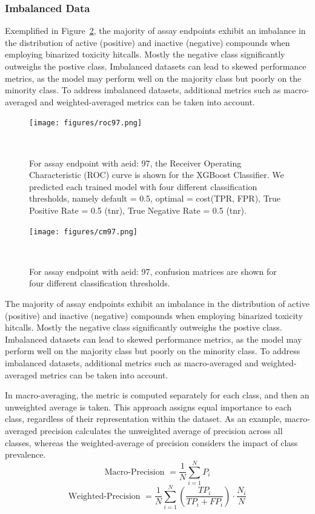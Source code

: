 \subsubsection{Imbalanced Data}
Exemplified in Figure~\ref{fig:confusion_matrix}, the majority of assay endpoints exhibit an imbalance in the distribution of active (positive) and inactive (negative) compounds when employing binarized toxicity hitcalls. Mostly the negative class significantly outweighs the postive class. Imbalanced datasets can lead to skewed performance metrics, as the model may perform well on the majority class but poorly on the minority class. To address imbalanced datasets, additional metrics such as macro-averaged and weighted-averaged metrics can be taken into account.
\begin{figure}[h]
  \centering
  \texttt{[image: figures/roc97.png]}
  \caption{For assay endpoint with aeid: 97, the Receiver Operating Characteristic (ROC) curve is shown for the XGBoost Classifier. We predicted each trained model with four different classification thresholds, namely default = 0.5, optimal = cost(TPR, FPR), True Positive Rate = 0.5 (tnr), True Negative Rate = 0.5 (tnr).}
~\label{fig:confusion_matrix}
\end{figure}


\begin{figure} 
  \centering
  \texttt{[image: figures/cm97.png]}
  \caption{For assay endpoint with aeid: 97, confusion matrices are shown for four different classification thresholds.}
~\label{fig:confusion_matrix}
\end{figure}

The majority of assay endpoints exhibit an imbalance in the distribution of active (positive) and inactive (negative) compounds when employing binarized toxicity hitcalls. Mostly the negative class significantly outweighs the postive class. Imbalanced datasets can lead to skewed performance metrics, as the model may perform well on the majority class but poorly on the minority class. To address imbalanced datasets, additional metrics such as macro-averaged and weighted-averaged metrics can be taken into account.

In macro-averaging, the metric is computed separately for each class, and then an unweighted average is taken. This approach assigns equal importance to each class, regardless of their representation within the dataset. As an example, macro-averaged precision calculates the unweighted average of precision across all classes, whereas the weighted-average of precision considers the impact of class prevalence.
\[ \text{Macro-Precision } = \frac{1}{N} \sum_{i=1}^{N} P_i \] 
\[ \text{Weighted-Precision } = \frac{1}{N} \sum_{i=1}^{N} \left(\frac{TP_i}{TP_i + FP_i}\right) \cdot \frac{N_i}{N} \]

